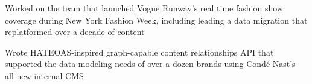 \begin{job}

  \begin{accomplishments}
    \item Worked on the team that launched Vogue Runway's real time fashion show
    coverage during New York Fashion Week, including leading a data migration
    that replatformed over a decade of content
  \end{accomplishments}
  
  \begin{extendedaccomplishments}
    \item Wrote HATEOAS-inspired graph-capable content relationships
    API that supported the data modeling needs of over a dozen brands using
    Cond\'{e} Nast's all-new internal CMS
  \end{extendedaccomplishments}
\end{job}

